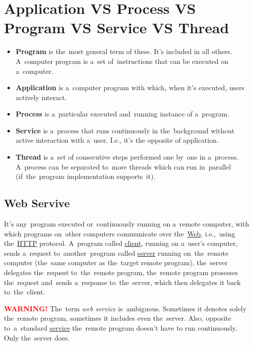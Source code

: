 \documentclass[12pt, dvipsnames, oneside, a4paper, titlepage, usenames]{report}
\newcommand{\newsubsection}[1]{\subsection*{#1}\addcontentsline{toc}{subsection}{#1}}
\newcommand{\highlight}[2]{\vspace{\baselineskip}\noindent\textcolor{#2}{\textbf{#1}}}
\newcommand{\warning}{\highlight{WARNING! }{red}}
\begin{document}
   \section*{\fontsize{17}{17} \selectfont Application VS Process VS Program VS Service VS Thread}
   \label{applicationprocessprogramservicethread}
   \begin{itemize}
        \item \textbf{Program} is the~most general term of these. It's included in all others. A~computer program is a~set of~instructions that can be executed on a~computer.
        \item \textbf{Application} is a~computer program with which, when it's executed, users actively interact.
        \item \textbf{Process} is a~particular executed and~running instance of a~program.
        \item \textbf{Service} is a~process that runs continuously in the~background without active interaction with a~user. I.e., it's the opposite of application.
        \item \textbf{Thread} is a~set of consecutive steps performed one by~one in a~process. A~process can be separated to~more threads which can run in~parallel (if~the~program implementation supports~it).
    \end{itemize}

    \newsubsection{Web Servive}
    \label{webservice}
    It's any~program executed or~continuously running on a~remote computer, with which programs on~other computers communicate over the~\hyperref[internetweb]{Web}, i.e.,~using the~\hyperref[http]{HTTP} protocol. A~program called \hyperref[clientserverarchitecture]{client}, running on a~user's computer, sends a~request to~another~program called \hyperref[clientserverarchitecture]{server} running on~the~remote computer (the~same computer as the~target remote program), the~server delegates the~request to~the~remote program, the~remote program prosesses the~request and~sends a~response to~the~server, which then delegates it back to~the~client.

    \warning The~term \textit{web service} is~ambiguous. Sometimes it denotes solely the~remote program, sometimes it includes even the~server. Also, opposite to~a~standard \hyperref[applicationprocessprogramservicethread]{service} the~remote program doesn't have to run continuously. Only the~server does.
\end{document}
